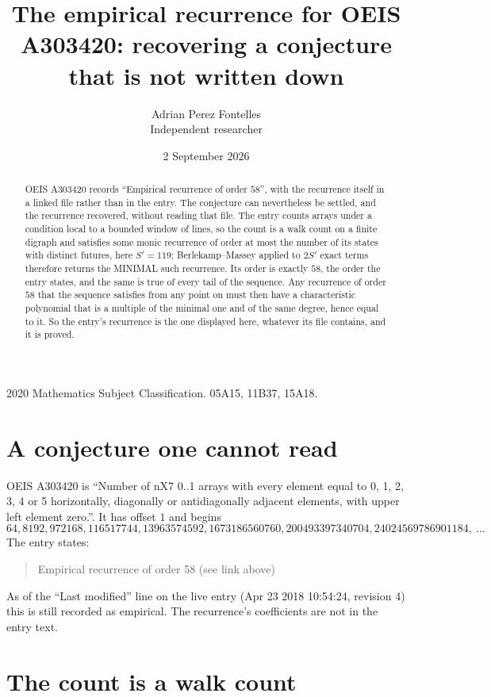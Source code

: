 \documentclass[11pt,a4paper]{article}
\title{The empirical recurrence for OEIS A303420: recovering a conjecture that is not written down}
\author{Adrian Perez Fontelles\\ \small Independent researcher}
\date{2 September 2026}
\theoremstyle{plain}
\theoremstyle{definition}
\begin{document}
\maketitle

\begin{abstract}
OEIS A303420 records ``Empirical recurrence of order $58$'', with the recurrence itself in a
linked file rather than in the entry. The conjecture can nevertheless be settled, and the
recurrence recovered, without reading that file. The entry counts arrays under a condition
local to a bounded window of lines, so the count is a walk count on a finite digraph and
satisfies some monic recurrence of order at most the number of its states with distinct
futures, here $S'=119$; Berlekamp--Massey applied to $2S'$ exact
terms therefore returns the MINIMAL such recurrence. Its order is exactly $58$, the order
the entry states, and the same is true of every tail of the sequence. Any recurrence of order
$58$ that the sequence satisfies from any point on must then have a characteristic
polynomial that is a multiple of the minimal one and of the same degree, hence equal to it. So
the entry's recurrence is the one displayed here, whatever its file contains, and it is
proved.
\end{abstract}

\noindent\small 2020 Mathematics Subject Classification. 05A15, 11B37, 15A18.\normalsize

\section{A conjecture one cannot read}

OEIS A303420 is ``Number of nX7 0..1 arrays with every element equal to 0, 1, 2, 3, 4 or 5 horizontally, diagonally or antidiagonally adjacent elements, with upper left element zero.''. It has offset $1$ and begins
\[
64, 8192, 972168, 116517744, 13963574592, 1673186560760, 200493397340704, 24024569786901184,\ \dots
\]
The entry states:
\begin{quote}
Empirical recurrence of order 58 (see link above)
\end{quote}
As of the ``Last modified'' line on the live entry (Apr 23 2018 10:54:24, revision 4) this is still
recorded as empirical. The recurrence's coefficients are not in the entry text.

\section{The count is a walk count}
\end{document}
